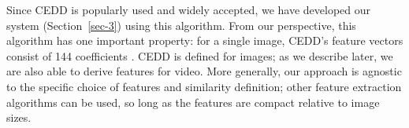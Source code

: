%

%
%


Since CEDD is popularly used and widely accepted, we have developed
our system (Section~\ref{sec-3}) using this algorithm.
%
From our perspective, this algorithm has one important property: for a
single image, CEDD's feature vectors consist of 144 coefficients
.
%
%
CEDD is defined for images; as we describe later, we are also able to
derive features for video.
%
More generally, our approach is agnostic to the specific choice of features
and similarity definition; other feature extraction algorithms can be
used, so long as the features are compact relative to image sizes.

